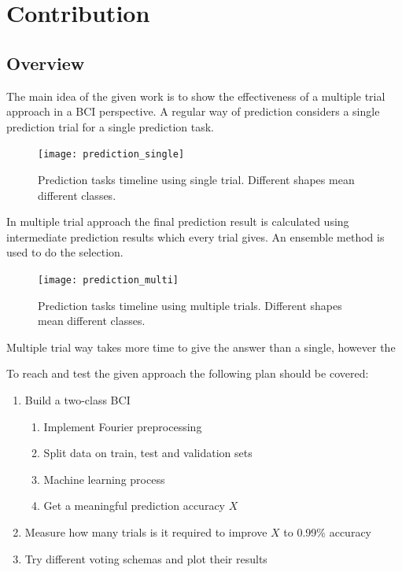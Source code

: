 \documentclass[12pt]{article}
\begin{document}
\newpage
\section{Contribution}

\subsection{Overview}
The main idea of the given work is to show the effectiveness of a multiple trial approach in a BCI perspective. 
A regular way of prediction considers a single prediction trial for a single prediction task.
\begin{figure} [H]
\begin{center}
\texttt{[image: prediction\_single]}
\caption{Prediction tasks timeline using single trial. Different shapes mean different classes.}
\label{fig:fnCompModel}
\end{center}
\end{figure}

In multiple trial approach the final prediction result is calculated using intermediate prediction results which every trial gives. An ensemble method is used to do the selection. 
\begin{figure} [H]
\begin{center}
\texttt{[image: prediction\_multi]}
\caption{Prediction tasks timeline using multiple trials. Different shapes mean different classes.}
\label{fig:fnCompModel}
\end{center}
\end{figure}
Multiple trial way takes more time to give the answer than a single, however the 

To reach and test the given approach the following plan should be covered:
\begin{enumerate}
\item Build a two-class BCI 
\begin{enumerate}
\item Implement Fourier preprocessing
\item Split data on train, test and validation sets
\item Machine learning process
\item Get a meaningful prediction accuracy $X$
\end{enumerate}
\item Measure how many trials is it required to improve $X$ to 0.99\% accuracy
\item Try different voting schemas and plot their results
\end{enumerate}
\end{document}
